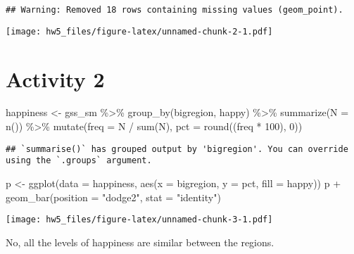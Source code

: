 \documentclass[
]{article}
\newenvironment{Shaded}{\begin{snugshade}}{\end{snugshade}}
\newcommand{\AttributeTok}[1]{\textcolor[rgb]{0.77,0.63,0.00}{#1}}
\newcommand{\DecValTok}[1]{\textcolor[rgb]{0.00,0.00,0.81}{#1}}
\newcommand{\FunctionTok}[1]{\textcolor[rgb]{0.00,0.00,0.00}{#1}}
\newcommand{\NormalTok}[1]{#1}
\newcommand{\OtherTok}[1]{\textcolor[rgb]{0.56,0.35,0.01}{#1}}
\newcommand{\SpecialCharTok}[1]{\textcolor[rgb]{0.00,0.00,0.00}{#1}}
\newcommand{\StringTok}[1]{\textcolor[rgb]{0.31,0.60,0.02}{#1}}
\begin{document}
\begin{verbatim}
## Warning: Removed 18 rows containing missing values (geom_point).
\end{verbatim}

\texttt{[image: hw5\_files/figure-latex/unnamed-chunk-2-1.pdf]}

\hypertarget{activity-2}{%
\section{Activity 2}\label{activity-2}}

\begin{Shaded}
\begin{Highlighting}[]
\NormalTok{happiness }\OtherTok{\textless{}{-}}\NormalTok{ gss\_sm }\SpecialCharTok{\%\textgreater{}\%}
  \FunctionTok{group\_by}\NormalTok{(bigregion, happy) }\SpecialCharTok{\%\textgreater{}\%}
  \FunctionTok{summarize}\NormalTok{(}\AttributeTok{N =} \FunctionTok{n}\NormalTok{()) }\SpecialCharTok{\%\textgreater{}\%}
  \FunctionTok{mutate}\NormalTok{(}\AttributeTok{freq =}\NormalTok{ N }\SpecialCharTok{/} \FunctionTok{sum}\NormalTok{(N),}
         \AttributeTok{pct =} \FunctionTok{round}\NormalTok{((freq }\SpecialCharTok{*} \DecValTok{100}\NormalTok{), }\DecValTok{0}\NormalTok{))}
\end{Highlighting}
\end{Shaded}

\begin{verbatim}
## `summarise()` has grouped output by 'bigregion'. You can override using the `.groups` argument.
\end{verbatim}

\begin{Shaded}
\begin{Highlighting}[]
\NormalTok{p }\OtherTok{\textless{}{-}} \FunctionTok{ggplot}\NormalTok{(}\AttributeTok{data =}\NormalTok{ happiness, }\FunctionTok{aes}\NormalTok{(}\AttributeTok{x =}\NormalTok{ bigregion, }\AttributeTok{y =}\NormalTok{ pct, }\AttributeTok{fill =}\NormalTok{ happy))}
\NormalTok{p }\SpecialCharTok{+} \FunctionTok{geom\_bar}\NormalTok{(}\AttributeTok{position =} \StringTok{"dodge2"}\NormalTok{, }\AttributeTok{stat =} \StringTok{"identity"}\NormalTok{)}
\end{Highlighting}
\end{Shaded}

\texttt{[image: hw5\_files/figure-latex/unnamed-chunk-3-1.pdf]}

No, all the levels of happiness are similar between the regions.
\end{document}
